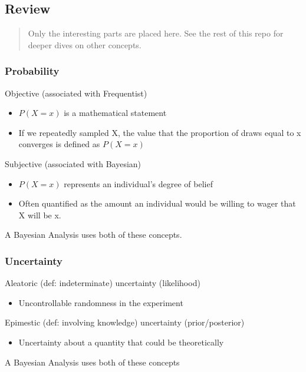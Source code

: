 \documentclass[11pt]{article}
\begin{document}
\subsection{Review}
\label{sec:org7b10b4e}

\begin{quote}
Only the interesting parts are placed here. See the rest of this repo for deeper
dives on other concepts.
\end{quote}

\subsubsection{Probability}
\label{sec:orgc1af0b5}
Objective (associated with Frequentist)
\begin{itemize}
\item \(P(X = x)\) is a mathematical statement
\item If we repeatedly sampled X, the value that the proportion of draws equal to x
converges is defined as \(P(X = x)\)
\end{itemize}

Subjective (associated with Bayesian)
\begin{itemize}
\item \(P(X = x)\) represents an individual's degree of belief
\item Often quantified as the amount an individual would be willing to wager that X
will be x.
\end{itemize}

A Bayesian Analysis uses both of these concepts.

\subsubsection{Uncertainty}
\label{sec:orgf0d4dca}

Aleatoric (def: indeterminate) uncertainty (likelihood)
\begin{itemize}
\item Uncontrollable randomness in the experiment
\end{itemize}

Epimestic (def: involving knowledge) uncertainty (prior/posterior)
\begin{itemize}
\item Uncertainty about a quantity that could be theoretically
\end{itemize}

A Bayesian Analysis uses both of these concepts
\end{document}
